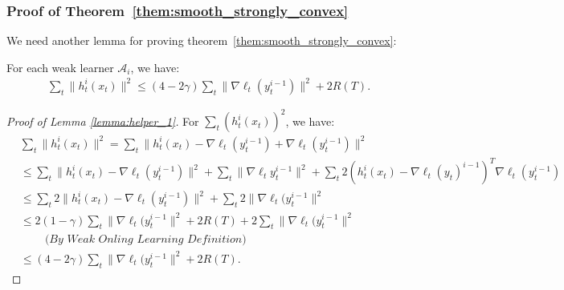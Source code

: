 \subsubsection{Proof of Theorem~\ref{them:smooth_strongly_convex}}
We need another lemma for proving theorem~\ref{them:smooth_strongly_convex}:
\begin{lemma}
\label{lemma:helper_1}
For each weak learner $\mathcal{A}_i$, we have:
\begin{align}
\sum_t \|h_t^i(x_t)\|^2 \leq (4-2\gamma)\sum_t\|\nabla\ell_t(y_t^{i-1})\|^2 + 2R(T).
\end{align}
\end{lemma}
\begin{proof}[Proof of Lemma \ref{lemma:helper_1}] For $\sum_t (h_t^i(x_t))^2$, we have:
\begin{align}
&\sum_t\|h_t^i(x_t)\|^2 = \sum_t \|h_t^i(x_t) - \nabla\ell_t(y_t^{i-1}) + \nabla\ell_t(y_t^{i-1})\|^2 \nonumber \\
& \leq \sum_t \|h_t^i(x_t)-\nabla\ell_t(y_t^{i-1})\|^2 + \sum_t\|\nabla\ell_ty_t^{i-1}\|^2 + \sum_t 2(h_t^i(x_t) - \nabla\ell_t(y_t)^{i-1})^T\nabla\ell_t(y_t^{i-1}) \nonumber \\
& \leq  \sum_t 2\|h_t^i(x_t)-\nabla\ell_t(y_t^{i-1})\|^2 + \sum_t2 \|\nabla\ell_t(y_t^{i-1}\|^2 \nonumber \\
& \leq 2(1-\gamma)\sum_t\|\nabla\ell_t(y_t^{i-1}\|^2 +2R(T) + 2\sum_t\|\nabla\ell_t(y_t^{i-1}\|^2 \nonumber \\
& \;\;\;\;\;\;\;\; \textit{(By Weak Onling Learning Definition)} \nonumber \\
& \leq (4-2\gamma)\sum_t\|\nabla\ell_t(y_t^{i-1}\|^2 + 2R(T).
\end{align}
\end{proof}


